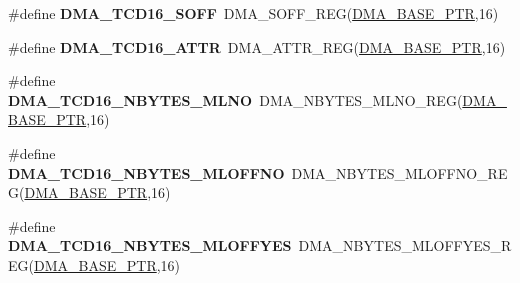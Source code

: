 \begin{DoxyCompactItemize}
\item 
\hypertarget{group___d_m_a___register___accessor___macros_gad428f438b81736cbf97243f603473d24}{}\#define {\bfseries D\+M\+A\+\_\+\+T\+C\+D16\+\_\+\+S\+O\+F\+F}~D\+M\+A\+\_\+\+S\+O\+F\+F\+\_\+\+R\+E\+G(\hyperlink{group___d_m_a___peripheral_ga6997fbc1b1973e9f27170217a3bd6f22}{D\+M\+A\+\_\+\+B\+A\+S\+E\+\_\+\+P\+T\+R},16)\label{group___d_m_a___register___accessor___macros_gad428f438b81736cbf97243f603473d24}

\item 
\hypertarget{group___d_m_a___register___accessor___macros_ga374720c63640eeeab3d40019f7a95bf7}{}\#define {\bfseries D\+M\+A\+\_\+\+T\+C\+D16\+\_\+\+A\+T\+T\+R}~D\+M\+A\+\_\+\+A\+T\+T\+R\+\_\+\+R\+E\+G(\hyperlink{group___d_m_a___peripheral_ga6997fbc1b1973e9f27170217a3bd6f22}{D\+M\+A\+\_\+\+B\+A\+S\+E\+\_\+\+P\+T\+R},16)\label{group___d_m_a___register___accessor___macros_ga374720c63640eeeab3d40019f7a95bf7}

\item 
\hypertarget{group___d_m_a___register___accessor___macros_gaf27ace6bb56c2ffc8e1248fd0964bc9c}{}\#define {\bfseries D\+M\+A\+\_\+\+T\+C\+D16\+\_\+\+N\+B\+Y\+T\+E\+S\+\_\+\+M\+L\+N\+O}~D\+M\+A\+\_\+\+N\+B\+Y\+T\+E\+S\+\_\+\+M\+L\+N\+O\+\_\+\+R\+E\+G(\hyperlink{group___d_m_a___peripheral_ga6997fbc1b1973e9f27170217a3bd6f22}{D\+M\+A\+\_\+\+B\+A\+S\+E\+\_\+\+P\+T\+R},16)\label{group___d_m_a___register___accessor___macros_gaf27ace6bb56c2ffc8e1248fd0964bc9c}

\item 
\hypertarget{group___d_m_a___register___accessor___macros_ga492742d2d588796733b4f7e5adfb4206}{}\#define {\bfseries D\+M\+A\+\_\+\+T\+C\+D16\+\_\+\+N\+B\+Y\+T\+E\+S\+\_\+\+M\+L\+O\+F\+F\+N\+O}~D\+M\+A\+\_\+\+N\+B\+Y\+T\+E\+S\+\_\+\+M\+L\+O\+F\+F\+N\+O\+\_\+\+R\+E\+G(\hyperlink{group___d_m_a___peripheral_ga6997fbc1b1973e9f27170217a3bd6f22}{D\+M\+A\+\_\+\+B\+A\+S\+E\+\_\+\+P\+T\+R},16)\label{group___d_m_a___register___accessor___macros_ga492742d2d588796733b4f7e5adfb4206}

\item 
\hypertarget{group___d_m_a___register___accessor___macros_ga71359f9dd5fb581254f516ad47e65b41}{}\#define {\bfseries D\+M\+A\+\_\+\+T\+C\+D16\+\_\+\+N\+B\+Y\+T\+E\+S\+\_\+\+M\+L\+O\+F\+F\+Y\+E\+S}~D\+M\+A\+\_\+\+N\+B\+Y\+T\+E\+S\+\_\+\+M\+L\+O\+F\+F\+Y\+E\+S\+\_\+\+R\+E\+G(\hyperlink{group___d_m_a___peripheral_ga6997fbc1b1973e9f27170217a3bd6f22}{D\+M\+A\+\_\+\+B\+A\+S\+E\+\_\+\+P\+T\+R},16)\label{group___d_m_a___register___accessor___macros_ga71359f9dd5fb581254f516ad47e65b41}


\end{DoxyCompactItemize}
